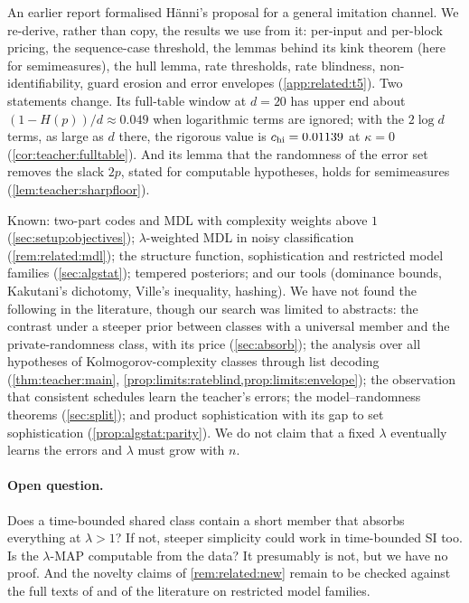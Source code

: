 \begin{remark}\label{rem:related:t5}
An earlier report \citep[section ``Simplicity and normativity from imitation'']{claude2026whatfollows} formalised H\"anni's proposal for a general imitation channel. We re-derive, rather than copy, the results we use from it: per-input and per-block pricing, the sequence-case threshold, the lemmas behind its kink theorem (here for semimeasures), the hull lemma, rate thresholds, rate blindness, non-identifiability, guard erosion and error envelopes (\cref{app:related:t5}). Two statements change. Its full-table window at $d=20$ has upper end about $(1-H(p))/d\approx0.049$ when logarithmic terms are ignored; with the $2\log d$ terms, as large as $d$ there, the rigorous value is $c_{\rm hi}=0.01139$ at $\kappa=0$ (\cref{cor:teacher:fulltable}). And its lemma that the randomness of the error set removes the slack $2p$, stated for computable hypotheses, holds for semimeasures (\cref{lem:teacher:sharpfloor}).
\end{remark}

\begin{remark}\label{rem:related:new}
Known: two-part codes and MDL with complexity weights above $1$ (\cref{sec:setup:objectives}); $\lambda$-weighted MDL in noisy classification (\cref{rem:related:mdl}); the structure function, sophistication and restricted model families (\cref{sec:algstat}); tempered posteriors; and our tools (dominance bounds, Kakutani's dichotomy, Ville's inequality, hashing). We have not found the following in the literature, though our search was limited to abstracts: the contrast under a steeper prior between classes with a universal member and the private-randomness class, with its price (\cref{sec:absorb}); the analysis over all hypotheses of Kolmogorov-complexity classes through list decoding (\cref{thm:teacher:main}, \cref{prop:limits:rateblind,prop:limits:envelope}); the observation that consistent schedules learn the teacher's errors; the model--randomness theorems (\cref{sec:split}); and product sophistication with its gap to set sophistication (\cref{prop:algstat:parity}). We do not claim that a fixed $\lambda$ eventually learns the errors and $\lambda$ must grow with $n$.
\end{remark}

\paragraph{Open question.}\label{q:related:open}
Does a time-bounded shared class contain a short member that absorbs everything at $\lambda>1$? If not, steeper simplicity could work in time-bounded SI too. Is the $\lambda$-MAP computable from the data? It presumably is not, but we have no proof. And the novelty claims of \cref{rem:related:new} remain to be checked against the full texts of \citet{zhu2025quantifying,zhu2026overfitting,grunwald2007suboptimal} and of the literature on restricted model families.
